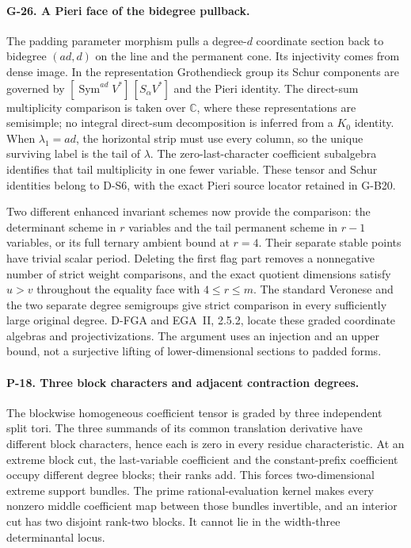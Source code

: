 \paragraph{G-26. A Pieri face of the bidegree pullback.}
The padding parameter morphism pulls a degree-$d$ coordinate
section back to bidegree $(ad,d)$ on the line and the permanent
cone. Its injectivity comes from dense image. In the representation
Grothendieck group its Schur components are governed by
$[\operatorname{Sym}^{ad}V^*]\,[S_\alpha V^*]$ and the
Pieri identity. The direct-sum multiplicity comparison is taken
over $\mathbb C$, where these representations are semisimple;
no integral direct-sum decomposition is inferred from a $K_0$
identity. When $\lambda_1=ad$, the horizontal strip must use
every column, so the unique surviving label is the tail of
$\lambda$. The zero-last-character coefficient subalgebra
identifies that tail multiplicity in one fewer variable.
These tensor and Schur identities belong to D-S6, with the exact
Pieri source locator retained in G-B20.

Two different enhanced invariant schemes now provide the
comparison: the determinant scheme in $r$ variables and the
tail permanent scheme in $r-1$ variables, or its full ternary
ambient bound at $r=4$. Their separate stable points have trivial
scalar period. Deleting the first flag part removes a nonnegative
number of strict weight comparisons, and the exact quotient
dimensions satisfy $u>v$ throughout the equality face with
$4\le r\le m$. The standard Veronese and the two separate
degree semigroups give strict comparison in every sufficiently
large original degree. D-FGA and EGA~II, 2.5.2, locate these
graded coordinate algebras and projectivizations. The argument
uses an injection and an upper bound, not a surjective lifting
of lower-dimensional sections to padded forms.

\paragraph{P-18. Three block characters and adjacent contraction degrees.}
The blockwise homogeneous coefficient tensor is graded by
three independent split tori. The three summands of its common
translation derivative have different block characters, hence
each is zero in every residue characteristic. At an extreme
block cut, the last-variable coefficient and the constant-prefix
coefficient occupy different degree blocks; their ranks add.
This forces two-dimensional extreme support bundles. The
prime rational-evaluation kernel makes every nonzero middle
coefficient map between those bundles invertible, and an
interior cut has two disjoint rank-two blocks. It cannot lie
in the width-three determinantal locus.

